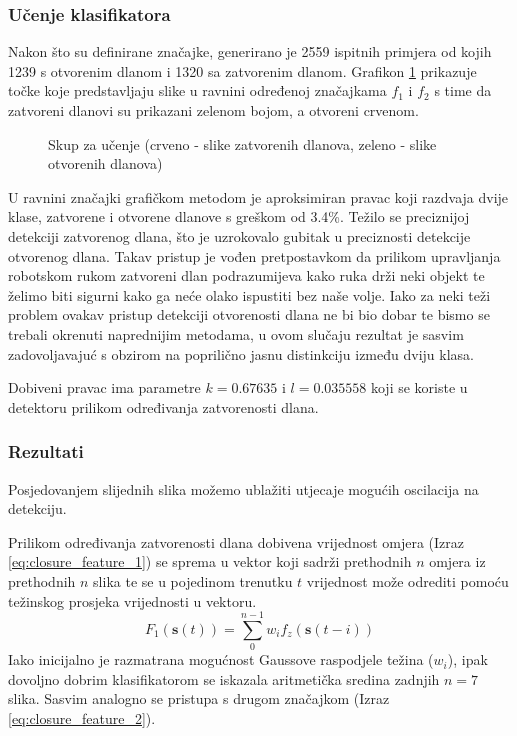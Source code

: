 \documentclass[times, utf8, diplomski, numeric]{fer}
\begin{document}
\subsubsection{Učenje klasifikatora}
Nakon što su definirane značajke, generirano je 2559 ispitnih primjera od kojih 1239 s otvorenim dlanom i 1320 sa zatvorenim dlanom. Grafikon \ref{scatter_me} prikazuje točke koje predstavljaju slike u ravnini određenoj značajkama $f_{1}$ i $f_{2}$ s time da zatvoreni dlanovi su prikazani zelenom bojom, a otvoreni crvenom.

\begin{figure}[h!]

\centering
%
\renewcommand{\figurename}{Grafikon}
	\caption{Skup za učenje (crveno - slike zatvorenih dlanova, zeleno - slike otvorenih dlanova)}
\label{scatter_me}
\end{figure}

U ravnini značajki grafičkom metodom je aproksimiran pravac koji razdvaja dvije klase, zatvorene i otvorene dlanove s greškom od 3.4\%. Težilo se preciznijoj detekciji zatvorenog dlana, što je uzrokovalo gubitak u preciznosti detekcije otvorenog dlana. Takav pristup je vođen pretpostavkom da prilikom upravljanja robotskom rukom zatvoreni dlan podrazumijeva kako ruka drži neki objekt te želimo biti sigurni kako ga neće olako ispustiti bez naše volje. Iako za neki teži problem ovakav pristup detekciji otvorenosti dlana ne bi bio dobar te bismo se trebali okrenuti naprednijim metodama, u ovom slučaju rezultat je sasvim zadovoljavajuć s obzirom na poprilično jasnu distinkciju između dviju klasa.

Dobiveni pravac ima parametre $k = 0.67635$ i $l=0.035558$ koji se koriste u detektoru prilikom određivanja zatvorenosti dlana.

\subsubsection{Rezultati}
\label{sec:tuning}
Posjedovanjem slijednih slika možemo ublažiti utjecaje mogućih oscilacija na detekciju.

Prilikom određivanja zatvorenosti dlana dobivena vrijednost omjera (Izraz \ref{eq:closure_feature_1}) se sprema u vektor koji sadrži prethodnih $ n $  omjera iz prethodnih $n$ slika te se u pojedinom trenutku $t$ vrijednost može odrediti pomoću težinskog prosjeka vrijednosti u vektoru.
\begin{equation}\label{eq:advanced_closure_feature}
F_{1}(\mathbf{s}(t))=\sum_{0}^{n-1} w_{i}f_{z}(\mathbf{s}(t-i))
\end{equation}
Iako inicijalno je razmatrana mogućnost Gaussove raspodjele težina ($w_{i}$), ipak dovoljno dobrim klasifikatorom se iskazala aritmetička sredina zadnjih $n=7$ slika. Sasvim analogno se pristupa s drugom značajkom (Izraz \ref{eq:closure_feature_2}).
\end{document}
